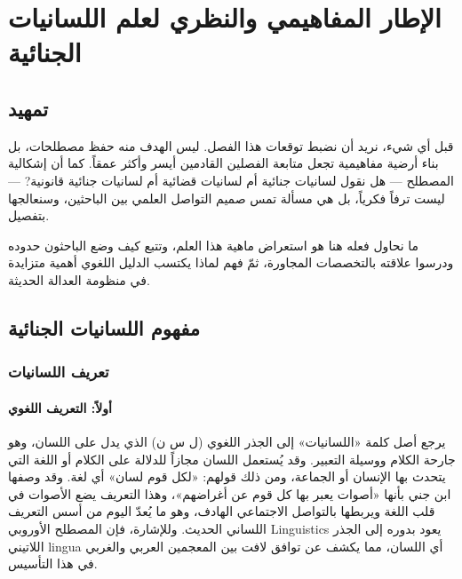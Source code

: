
\chapter{الإطار المفاهيمي والنظري لعلم اللسانيات الجنائية}

\section*{تمهيد}

قبل أي شيء، نريد أن نضبط توقعات هذا الفصل. ليس الهدف منه حفظ مصطلحات، بل بناء أرضية مفاهيمية تجعل متابعة الفصلين القادمين أيسر وأكثر عمقاً. كما أن إشكالية المصطلح --- هل نقول لسانيات جنائية أم لسانيات قضائية أم لسانيات جنائية قانونية? --- ليست ترفاً فكرياً، بل هي مسألة تمس صميم التواصل العلمي بين الباحثين، وسنعالجها بتفصيل.

ما نحاول فعله هنا هو استعراض ماهية هذا العلم، وتتبع كيف وضع الباحثون حدوده ودرسوا علاقته بالتخصصات المجاورة، ثمّ فهم لماذا يكتسب الدليل اللغوي أهمية متزايدة في منظومة العدالة الحديثة.



\clearpage

\section{مفهوم اللسانيات الجنائية}

\subsection{تعريف اللسانيات}

\subsubsection*{أولاً: التعريف اللغوي}

يرجع أصل كلمة «اللسانيات» إلى الجذر اللغوي (ل س ن) الذي يدل على اللسان، وهو جارحة الكلام ووسيلة التعبير. وقد يُستعمل اللسان مجازاً للدلالة على الكلام أو اللغة التي يتحدث بها الإنسان أو الجماعة، ومن ذلك قولهم: «لكل قوم لسان» أي لغة. وقد وصفها ابن جني بأنها «أصوات يعبر بها كل قوم عن أغراضهم»\autocite[33]{ibnjinni}، وهذا التعريف يضع الأصوات في قلب اللغة ويربطها بالتواصل الاجتماعي الهادف، وهو ما يُعدّ اليوم من أسس التعريف اللساني الحديث. وللإشارة، فإن المصطلح الأوروبي \textenglish{Linguistics} يعود بدوره إلى الجذر اللاتيني \textenglish{lingua} أي اللسان، مما يكشف عن توافق لافت بين المعجمين العربي والغربي في هذا التأسيس.

